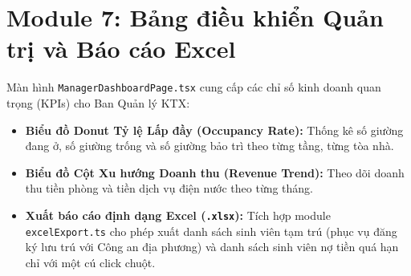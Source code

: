 \section{Module 7: Bảng điều khiển Quản trị và Báo cáo Excel}
Màn hình \texttt{ManagerDashboardPage.tsx} cung cấp các chỉ số kinh doanh quan trọng (KPIs) cho Ban Quản lý KTX:
\begin{itemize}
    \item \textbf{Biểu đồ Donut Tỷ lệ Lấp đầy (Occupancy Rate):} Thống kê số giường đang ở, số giường trống và số giường bảo trì theo từng tầng, từng tòa nhà.
    \item \textbf{Biểu đồ Cột Xu hướng Doanh thu (Revenue Trend):} Theo dõi doanh thu tiền phòng và tiền dịch vụ điện nước theo từng tháng.
    \item \textbf{Xuất báo cáo định dạng Excel (\texttt{.xlsx}):} Tích hợp module \texttt{excelExport.ts} cho phép xuất danh sách sinh viên tạm trú (phục vụ đăng ký lưu trú với Công an địa phương) và danh sách sinh viên nợ tiền quá hạn chỉ với một cú click chuột.
\end{itemize}

